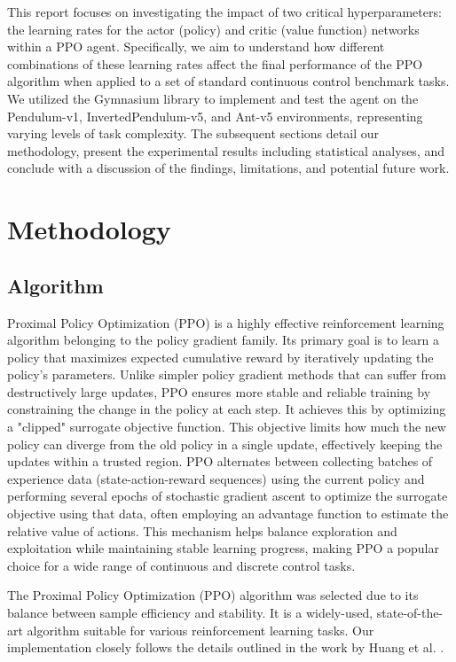 \documentclass{article}
\begin{document}
This report focuses on investigating the impact of two critical hyperparameters: the learning rates for the actor (policy) and critic (value function) networks within a PPO agent. Specifically, we aim to understand how different combinations of these learning rates affect the final performance of the PPO algorithm when applied to a set of standard continuous control benchmark tasks. We utilized the Gymnasium library \cite{towers2024gymnasium} to implement and test the agent on the Pendulum-v1, InvertedPendulum-v5, and Ant-v5 environments, representing varying levels of task complexity. The subsequent sections detail our methodology, present the experimental results including statistical analyses, and conclude with a discussion of the findings, limitations, and potential future work.

\section{Methodology}

\subsection{Algorithm}

Proximal Policy Optimization (PPO) is a highly effective reinforcement learning algorithm belonging to the policy gradient family. Its primary goal is to learn a policy that maximizes expected cumulative reward by iteratively updating the policy's parameters. Unlike simpler policy gradient methods that can suffer from destructively large updates, PPO ensures more stable and reliable training by constraining the change in the policy at each step. It achieves this by optimizing a "clipped" surrogate objective function. This objective limits how much the new policy can diverge from the old policy in a single update, effectively keeping the updates within a trusted region. PPO alternates between collecting batches of experience data (state-action-reward sequences) using the current policy and performing several epochs of stochastic gradient ascent to optimize the surrogate objective using that data, often employing an advantage function to estimate the relative value of actions. This mechanism helps balance exploration and exploitation while maintaining stable learning progress, making PPO a popular choice for a wide range of continuous and discrete control tasks.

The Proximal Policy Optimization (PPO) algorithm was selected due to its balance between sample efficiency and stability. It is a widely-used, state-of-the-art algorithm suitable for various reinforcement learning tasks. Our implementation closely follows the details outlined in the work by Huang et al. \cite{shengyi2022the37implementation}.
\end{document}
